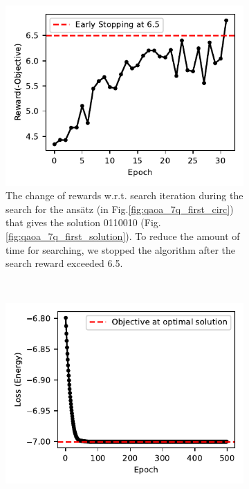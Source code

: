 \documentclass{ieeeaccess}
\begin{document}
\begin{figure}[ht!]
    \centering
    \begin{subfigure}[t]{0.48\linewidth}
        \includegraphics[width=0.95\linewidth]{peiyong_fig_20.pdf}
        \caption{The change of rewards w.r.t. search iteration during the search for the ans\"atz (in Fig.\ref{fig:qaoa_7q_first_circ}) that gives the solution 0110010 (Fig. \ref{fig:qaoa_7q_first_solution}). To reduce the amount of time for searching, we stopped the algorithm after the search reward exceeded 6.5.}
        \label{fig:qaoa_search_reward_1}
    \end{subfigure}
    ~
    \begin{subfigure}[t]{0.48\linewidth}
        \includegraphics[width=\linewidth]{peiyong_fig_21.pdf}

\end{subfigure}
\end{figure}
\end{document}
